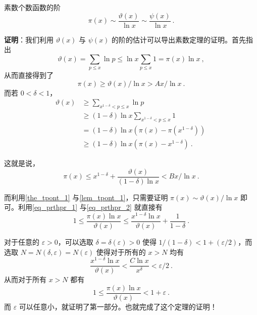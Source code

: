 

\begin{theorem}{素数个数函数的阶}
\begin{equation}
\pi(x) \sim \frac{\vartheta(x)}{\ln x} \sim \frac{\psi(x)}{\ln x} ~.
\end{equation}

\end{theorem}
\textbf{证明}：我们利用 $\vartheta(x)$ 与 $\psi(x)$ 的阶的估计可以导出素数定理的证明。首先指出
\begin{equation}
\vartheta(x) = \sum_{p \le x} \ln p \le \ln x \sum_{p \le x} 1 = \pi(x) \ln x ~,
\end{equation}
从而直接得到了
\begin{equation}\label{eq_prthpr_1}
\pi(x) \ge \vartheta(x)/\ln x > Ax / \ln x ~.
\end{equation}
而若 $0 < \delta < 1$，
\begin{equation}
\begin{aligned}
\vartheta(x) &\ge \sum_{x^{1-\delta} < p \le x} \ln p ~\\
&\ge (1-\delta) \ln x \sum_{x^{1-\delta} < p \le x} 1 ~\\
&= (1-\delta) \ln x \left( \pi(x) - \pi(x^{1-\delta}) \right) ~\\
&\ge (1-\delta) \ln x \left( \pi(x) - x^{1-\delta} \right) ~.
\end{aligned}
\end{equation}

这就是说，
\begin{equation}\label{eq_prthpr_2}
\pi(x) \le x^{1-\delta} + \frac{\vartheta(x)}{(1-\delta) \ln x} < Bx/\ln x ~.
\end{equation}

而利用\autoref{the_tpont_1} 与\autoref{lem_tpont_1}，只需要证明 $\pi(x) \sim \vartheta(x)/\ln x$ 即可。利用\autoref{eq_prthpr_1} 与\autoref{eq_prthpr_2} 就直接有
\begin{equation}
1 \le \frac{\pi(x) \ln x}{\vartheta(x)} \le \frac{x^{1-\delta} \ln x}{\vartheta(x)} + \frac{1}{1-\delta} ~.
\end{equation}

对于任意的 $\varepsilon > 0$，可以选取 $\delta = \delta(\varepsilon) > 0$ 使得 $1/(1-\delta) < 1+ (\varepsilon/2)$，而选取 $N = N(\delta, \varepsilon) = N(\varepsilon)$ 使得对于所有的 $x > N$ 均有
\begin{equation}
\frac{x^{1-\delta}\ln x}{\vartheta(x)} < \frac{C \ln x}{x^\delta} < \varepsilon/2 ~.
\end{equation}
从而对于所有 $x>N$ 都有
\begin{equation}
1 \le \frac{\pi(x) \ln x}{\vartheta(x)} < 1+ \varepsilon ~.
\end{equation}
而 $\varepsilon$ 可以任意小，就证明了第一部分。也就完成了这个定理的证明！


